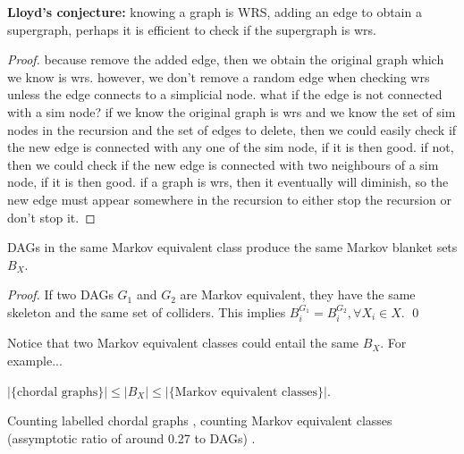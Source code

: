 \textbf{Lloyd's conjecture:} knowing a graph is WRS, adding an edge to obtain a supergraph, perhaps it is efficient to check if the supergraph is wrs.

\begin{proof}
because remove the added edge, then we obtain the original graph which we know is wrs. however, we don't remove a random edge when checking wrs unless the edge connects to a simplicial node. what if the edge is not connected with a sim node? if we know the original graph is wrs and we know the set of sim nodes in the recursion and the set of edges to delete, then we could easily check if the new edge is connected with any one of the sim node, if it is then good. if not, then we could check if the new edge is connected with two neighbours of a sim node, if it is then good. if a graph is wrs, then it eventually will diminish, so the new edge must appear somewhere in the recursion to either stop the recursion or don't stop it.
\end{proof} 

\begin{corollary}
DAGs in the same Markov equivalent class produce the same Markov blanket sets $B_X$. 
\end{corollary}
\begin{proof}
If two DAGs $G_1$ and $G_2$ are Markov equivalent, they have the same skeleton and the same set of colliders. This implies $B_i^{G_1} = B_i^{G_2}, \forall X_i \in X$. \qed
\end{proof}
Notice that two Markov equivalent classes could entail the same $B_X$. For example... 

\begin{corollary}
$|\{\text{chordal graphs}\}| \le |B_X| \le |\{\text{Markov equivalent classes}\}|$.
\end{corollary} 

Counting labelled chordal graphs \cite{wormald1985counting}, counting Markov equivalent classes (assymptotic ratio of around 0.27 to DAGs) \cite{gillispie2001enumerating}. 

